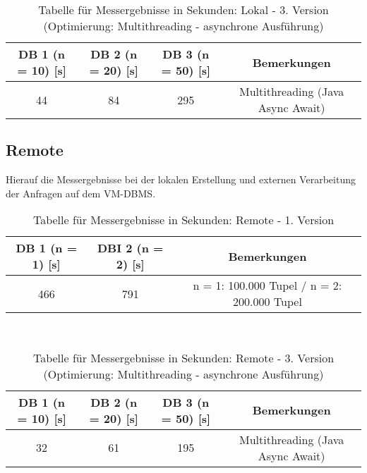 \begin{table}[h!]
    \centering
    \begin{tabular}{|c|c|c|c|}
        \hline
        DB 1 (n = 10) [s] & DB 2 (n = 20) [s] & DB 3 (n = 50) [s] & Bemerkungen \\  \hline
        44 & 84 & 295 & Multithreading (Java Async Await)\\ \hline
    \end{tabular}
    \caption{Tabelle für Messergebnisse in Sekunden: Lokal - 3. Version (Optimierung: Multithreading - asynchrone Ausführung)}
    \label{tab:8}
\end{table}

\newpage
\subsection{Remote}\label{subsec:remote}
Hierauf die Messergebnisse bei der lokalen Erstellung und externen Verarbeitung der Anfragen auf dem VM-DBMS. \\
\begin{table}[h!]
    \centering
    \begin{tabular}{|c|c|c|}
        \hline
        DB 1 (n = 1) [s] & DBI 2 (n = 2) [s] & Bemerkungen \\  \hline
        466 & 791 & n = 1: 100.000 Tupel / n = 2: 200.000 Tupel\\ \hline
    \end{tabular}
    \caption{Tabelle für Messergebnisse in Sekunden: Remote - 1. Version}
    \label{tab:9}
\end{table} \\

\begin{table}[h!]
    \centering
    \begin{tabular}{|c|c|c|c|}
        \hline
        DB 1 (n = 10) [s] & DB 2 (n = 20) [s] & DB 3 (n = 50) [s] & Bemerkungen \\  \hline
        32 & 61 & 195 & Multithreading (Java Async Await)\\ \hline
    \end{tabular}
    \caption{Tabelle für Messergebnisse in Sekunden: Remote - 3. Version (Optimierung: Multithreading - asynchrone Ausführung)}
    \label{tab:10}
\end{table}